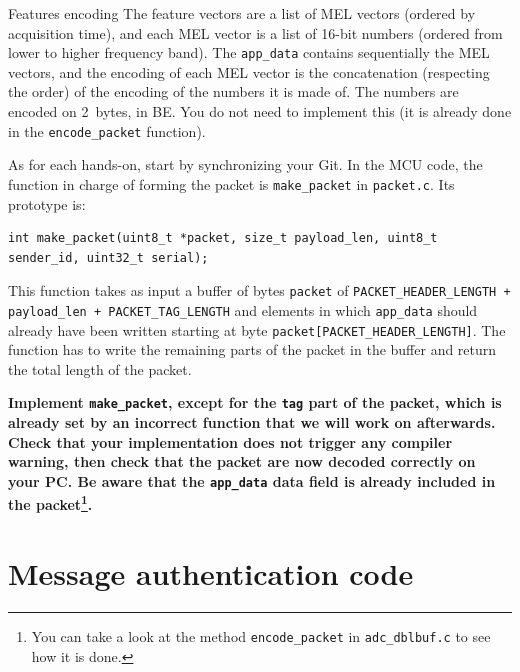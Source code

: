 \begin{bclogo}[couleur = gray!20, arrondi = 0.2, logo=\bcinfo]{Features encoding}
    The feature vectors are a list of MEL vectors (ordered by acquisition
    time), and each MEL vector is a list of 16-bit numbers (ordered from lower
    to higher frequency band).
    The \texttt{app\_data} contains sequentially the MEL vectors, and the
    encoding of each MEL vector is the concatenation (respecting the order) of
    the encoding of the numbers it is made of.  The numbers are encoded on
    2~bytes, in BE.
    You do not need to implement this (it is already done in the \verb|encode_packet| function).
\end{bclogo}

As for each hands-on, start by synchronizing your Git. In the MCU code, the function in charge of forming the packet is
\verb|make_packet| in \texttt{packet.c}.
Its prototype is:
\begin{lstlisting}[style=customc]
int make_packet(uint8_t *packet, size_t payload_len, uint8_t sender_id, uint32_t serial);
\end{lstlisting}
This function takes as input a buffer of bytes \texttt{packet} of
\texttt{PACKET\_HEADER\_LENGTH + payload\_len + PACKET\_TAG\_LENGTH} and elements in
which \texttt{app\_data} should already have been written starting at byte
\verb|packet[PACKET_HEADER_LENGTH]|.
The function has to write the remaining parts of the packet in the buffer and
return the total length of the packet.

\textbf{
    Implement \texttt{make\_packet}, except for the \texttt{tag} part of the
    packet, which is already set by an incorrect function that we will work on afterwards.
    Check that your implementation does not trigger any compiler warning, then
    check that the packet are now decoded correctly on your PC. Be aware that the \texttt{app\_data} data field is already included in the packet\footnote{You can take a look at the method \texttt{encode\_packet} in \texttt{adc\_dblbuf.c} to see how it is done.}.
}

\section{Message authentication code}

